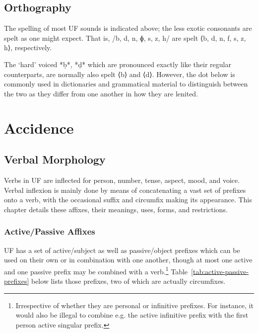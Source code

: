\documentclass[a4paper, 12pt, oneside, final]{article}
\begin{document}

\subsection{Orthography}
The spelling of most UF sounds is indicated above; the less exotic consonants are spelt as
one might expect. That is, /b, d, n, ɸ, s, z, h/ are spelt ⟨b, d, n, f, s, z, h⟩, respectively.

The ‘hard’ voiced *ḅ*, *ḍ* which are pronounced exactly like their regular counterparts, are normally also spelt ⟨b⟩ and
⟨d⟩. However, the dot below is commonly used in dictionaries and grammatical material to distinguish between the two
as they differ from one another in how they are lenited.


\section{Accidence}\label{sec:accidence}
\subsection{Verbal Morphology}\label{subsec:verbal-morphology}
Verbs in UF are inflected for person, number, tense, aspect, mood, and voice. Verbal inflexion is mainly done
by means of concatenating a vast set of prefixes onto a verb, with the occasional suffix and circumfix making
its appearance. This chapter details these affixes, their meanings, uses, forms, and restrictions.


\subsubsection{Active/Passive Affixes}\label{subsubsec:active-passive-affixes}
UF has a set of active/subject as well as passive/object prefixes which can be used on their own or in combination
with one another, though at most one active and one passive prefix may be combined with a verb.\footnote{Irrespective
of whether they are personal or infinitive prefixes. For instance, it would also be illegal to combine e.g. the active
infinitive prefix with the first person active singular prefix.} Table~\ref{tab:active-passive-prefixes}
below lists those prefixes, two of which are actually circumfixes.
\end{document}
